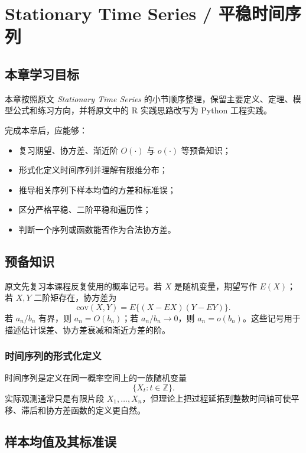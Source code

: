\documentclass[11pt,a4paper,openany]{ctexbook}
\begin{document}
\clearpage
\chapter{Stationary Time Series / 平稳时间序列}
\section*{本章学习目标}

本章按照原文 \textit{Stationary Time Series} 的小节顺序整理，保留主要定义、定理、模型公式和练习方向，并将原文中的 R 实践思路改写为 Python 工程实践。

完成本章后，应能够：
\begin{itemize}
  \item 复习期望、协方差、渐近阶 \(O(\cdot)\) 与 \(o(\cdot)\) 等预备知识；
  \item 形式化定义时间序列并理解有限维分布；
  \item 推导相关序列下样本均值的方差和标准误；
  \item 区分严格平稳、二阶平稳和遍历性；
  \item 判断一个序列或函数能否作为合法协方差。
\end{itemize}

\section{预备知识}

原文先复习本课程反复使用的概率记号。若 \(X\) 是随机变量，期望写作 \(E(X)\)；若 \(X,Y\) 二阶矩存在，协方差为
\[
  \mathrm{cov}(X,Y)=E\{(X-E X)(Y-E Y)\}.
\]
若 \(a_n/b_n\) 有界，则 \(a_n=O(b_n)\)；若 \(a_n/b_n\to0\)，则 \(a_n=o(b_n)\)。这些记号用于描述估计误差、协方差衰减和渐近方差的阶。

\subsection{时间序列的形式化定义}

时间序列是定义在同一概率空间上的一族随机变量
\[
  \{X_t:t\in\mathbb Z\}.
\]
实际观测通常只是有限片段 \(X_1,\ldots,X_n\)，但理论上把过程延拓到整数时间轴可使平移、滞后和协方差函数的定义更自然。

\section{样本均值及其标准误}
\end{document}

